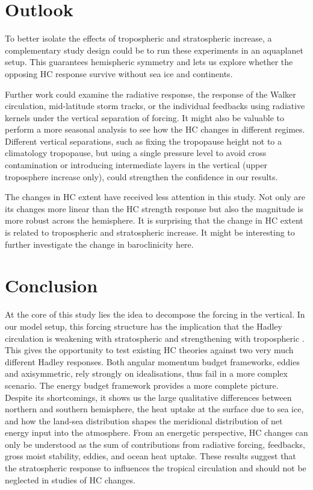 \section{Outlook}
To better isolate the effects of tropospheric and stratospheric \CO increase, a complementary study design could be to run these experiments in an aquaplanet setup. This guarantees hemispheric symmetry and lets us explore whether the opposing HC response survive without sea ice and continents.

Further work could examine the radiative response, the response of the Walker circulation, mid-latitude storm tracks, or the individual feedbacks using radiative kernels under the vertical separation of \CO forcing. It might also be valuable to perform a more seasonal analysis to see how the HC changes in different regimes. Different vertical separations, such as fixing the tropopause height not to a climatology tropopause, but using a single pressure level to avoid cross contamination or introducing intermediate layers in the vertical (upper troposphere \CO increase only), could strengthen the confidence in our results.

The changes in HC extent have received less attention in this study. Not only are its changes more linear than the HC strength response but also the magnitude is more robust across the hemisphere. It is surprising that the change in HC extent is related to tropospheric and stratospheric \CO increase. It might be interesting to further investigate the change in baroclinicity here.

\section{Conclusion}

At the core of this study lies the idea to decompose the \CO forcing in the vertical. In our model setup, this forcing structure has the implication that the Hadley circulation is weakening with stratospheric \CO and strengthening with tropospheric \CO. This gives the opportunity to test existing HC theories against two very much different Hadley responses. Both angular momentum budget frameworks, eddies and axisymmetric, rely strongly on idealisations, thus fail in a more complex scenario. The energy budget framework provides a more complete picture. Despite its shortcomings, it shows us the large qualitative differences between northern and southern hemisphere, the heat uptake at the surface due to sea ice, and how the land-sea distribution shapes the meridional distribution of net energy input into the atmosphere. From an energetic perspective, HC changes can only be understood as the sum of contributions from radiative forcing, feedbacks, gross moist stability, eddies, and ocean heat uptake. These results suggest that the stratospheric response to \CO influences the tropical circulation and should not be neglected in studies of HC changes.


